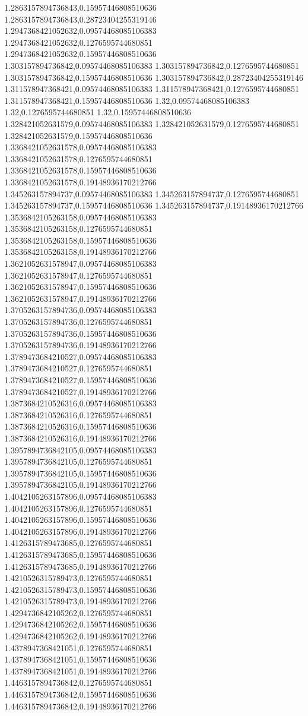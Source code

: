 1.2863157894736843,0.15957446808510636
1.2863157894736843,0.28723404255319146
1.2947368421052632,0.09574468085106383
1.2947368421052632,0.1276595744680851
1.2947368421052632,0.15957446808510636
1.303157894736842,0.09574468085106383
1.303157894736842,0.1276595744680851
1.303157894736842,0.15957446808510636
1.303157894736842,0.28723404255319146
1.311578947368421,0.09574468085106383
1.311578947368421,0.1276595744680851
1.311578947368421,0.15957446808510636
1.32,0.09574468085106383
1.32,0.1276595744680851
1.32,0.15957446808510636
1.328421052631579,0.09574468085106383
1.328421052631579,0.1276595744680851
1.328421052631579,0.15957446808510636
1.3368421052631578,0.09574468085106383
1.3368421052631578,0.1276595744680851
1.3368421052631578,0.15957446808510636
1.3368421052631578,0.19148936170212766
1.345263157894737,0.09574468085106383
1.345263157894737,0.1276595744680851
1.345263157894737,0.15957446808510636
1.345263157894737,0.19148936170212766
1.3536842105263158,0.09574468085106383
1.3536842105263158,0.1276595744680851
1.3536842105263158,0.15957446808510636
1.3536842105263158,0.19148936170212766
1.3621052631578947,0.09574468085106383
1.3621052631578947,0.1276595744680851
1.3621052631578947,0.15957446808510636
1.3621052631578947,0.19148936170212766
1.3705263157894736,0.09574468085106383
1.3705263157894736,0.1276595744680851
1.3705263157894736,0.15957446808510636
1.3705263157894736,0.19148936170212766
1.3789473684210527,0.09574468085106383
1.3789473684210527,0.1276595744680851
1.3789473684210527,0.15957446808510636
1.3789473684210527,0.19148936170212766
1.3873684210526316,0.09574468085106383
1.3873684210526316,0.1276595744680851
1.3873684210526316,0.15957446808510636
1.3873684210526316,0.19148936170212766
1.3957894736842105,0.09574468085106383
1.3957894736842105,0.1276595744680851
1.3957894736842105,0.15957446808510636
1.3957894736842105,0.19148936170212766
1.4042105263157896,0.09574468085106383
1.4042105263157896,0.1276595744680851
1.4042105263157896,0.15957446808510636
1.4042105263157896,0.19148936170212766
1.4126315789473685,0.1276595744680851
1.4126315789473685,0.15957446808510636
1.4126315789473685,0.19148936170212766
1.4210526315789473,0.1276595744680851
1.4210526315789473,0.15957446808510636
1.4210526315789473,0.19148936170212766
1.4294736842105262,0.1276595744680851
1.4294736842105262,0.15957446808510636
1.4294736842105262,0.19148936170212766
1.4378947368421051,0.1276595744680851
1.4378947368421051,0.15957446808510636
1.4378947368421051,0.19148936170212766
1.4463157894736842,0.1276595744680851
1.4463157894736842,0.15957446808510636
1.4463157894736842,0.19148936170212766

